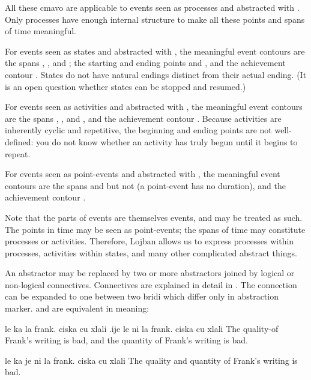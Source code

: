 All these cmavo are applicable to events seen as processes and
    abstracted with . Only processes have enough internal
    structure to make all these points and spans of time
    meaningful. 

For events seen as states and abstracted with , the
    meaningful event contours are the spans , , and
    ; the starting and ending points  and ,
    and the achievement contour . States do not have
    natural endings distinct from their actual ending. (It is an
    open question whether states can be stopped and resumed.)

For events seen as activities and abstracted with ,
    the meaningful event contours are the spans , ,
    and , and the achievement contour . Because
    activities are inherently cyclic and repetitive, the beginning
    and ending points are not well-defined: you do not know whether
    an activity has truly begun until it begins to repeat.

For events seen as point-events and abstracted with
    , the meaningful event contours are the spans 
    and  but not  (a point-event has no duration),
    and the achievement contour .

Note that the parts of events are themselves events, and may
    be treated as such. The points in time may be seen as 
    point-events; the spans of time may constitute processes or
    activities. Therefore, Lojban allows us to express processes
    within processes, activities within states, and many other
    complicated abstract things.



An abstractor may be replaced by two or more abstractors
    joined by logical or non-logical connectives. Connectives are
    explained in detail in .
    The connection can be expanded to one between two bridi which
    differ only in abstraction marker.  and  are equivalent
    in meaning:
\begin{example}
le ka la frank. ciska cu xlali\n
\T	.ije le ni la frank. ciska cu xlali\n
The quality-of Frank's writing is bad,\n
\T	and the quantity of Frank's writing is bad.
\end{example}

\begin{example}
le ka je ni la frank. ciska cu xlali\n
The quality and quantity of Frank's writing is bad.
\end{example}


